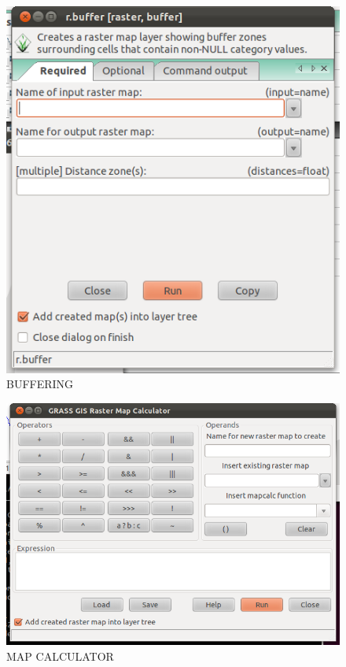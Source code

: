 \begin{figure}[htbp]
   \centering
   \includegraphics[scale=0.35]{grass015.png}
   \caption{BUFFERING}
   \label{fig:grass015}
\end{figure}

\begin{figure}[htbp]
   \centering
   \includegraphics[scale=0.35]{grass016.png}
   \caption{MAP CALCULATOR}
   \label{fig:grass016}
\end{figure}

